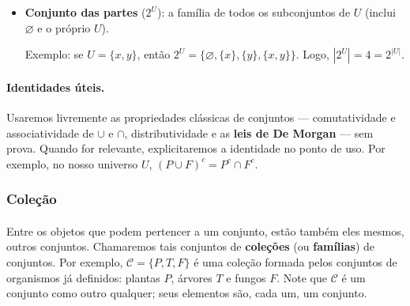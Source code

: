 \documentclass[12pt,a4paper]{article}
\begin{document}
\begin{itemize}
    \paragraph{}
    \item \textbf{Conjunto das partes} (\(2^U\)): a família de todos os subconjuntos de \(U\) (inclui \(\varnothing\) e o próprio \(U\)).
    
    Exemplo: se \(U = \{x,y\}\), então \(2^U = \{\varnothing, \{x\}, \{y\}, \{x,y\}\}\). Logo, \(|2^U|=4=2^{|U|}\).
    \begin{center}
    \label{fig:op-partes}
    \end{center}
\end{itemize}

\paragraph{Identidades úteis.}
Usaremos livremente as propriedades clássicas de conjuntos — comutatividade e associatividade de \(\cup\) e \(\cap\), distributividade e as \textbf{leis de De Morgan} — sem prova. Quando for relevante, explicitaremos a identidade no ponto de uso. Por exemplo, no nosso universo \(U\), \((P\cup F)^c = P^c\cap F^c\).

\subsubsection{Coleção}

\paragraph{}
Entre os objetos que podem pertencer a um conjunto, estão também eles mesmos, outros conjuntos. Chamaremos tais conjuntos de \textbf{coleções} (ou \textbf{famílias}) de conjuntos. Por exemplo, \(\mathcal{C} = \{P, T, F\}\) é uma coleção formada pelos conjuntos de organismos já definidos: plantas \(P\), árvores \(T\) e fungos \(F\). Note que \(\mathcal{C}\) é um conjunto como outro qualquer; seus elementos são, cada um, um conjunto.
\end{document}
